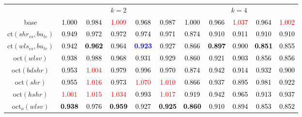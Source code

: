 \begin{tabular}[t]{c|>{}cccc>{}c|ccccc}
\multicolumn{1}{c}{} & \multicolumn{5}{c}{\textbf{$k = 2$}} & \multicolumn{5}{c}{\textbf{$k = 4$}}\\
base & \textcolor{black}{1.000} & \textcolor{black}{0.984} & \textcolor{red}{1.009} & \textcolor{black}{0.968} & \textcolor{black}{0.987} & \textcolor{black}{1.000} & \textcolor{black}{0.966} & \textcolor{red}{1.037} & \textcolor{black}{0.964} & \textcolor{red}{1.002}\\
ct$(shr_{cs}, bu_{te})$ & \textcolor{black}{0.949} & \textcolor{black}{0.972} & \textcolor{black}{0.972} & \textcolor{black}{0.974} & \textcolor{black}{0.971} & \textcolor{black}{0.874} & \textcolor{black}{0.910} & \textcolor{black}{0.911} & \textcolor{black}{0.910} & \textcolor{black}{0.910}\\
ct$(wls_{cs}, bu_{te})$ & \textcolor{black}{0.942} & \textcolor{black}{\textbf{0.962}} & \textcolor{black}{0.964} & \textcolor{blue}{\textbf{0.923}} & \textcolor{black}{0.927} & \textcolor{black}{0.866} & \textcolor{black}{\textbf{0.897}} & \textcolor{black}{0.900} & \textcolor{black}{\textbf{0.851}} & \textcolor{black}{0.855}\\
oct$(wlsv)$ & \textcolor{black}{0.938} & \textcolor{black}{0.988} & \textcolor{black}{0.968} & \textcolor{black}{0.931} & \textcolor{black}{0.929} & \textcolor{black}{0.860} & \textcolor{black}{0.921} & \textcolor{black}{0.903} & \textcolor{black}{0.856} & \textcolor{black}{0.856}\\
oct$(bdshr)$ & \textcolor{black}{0.953} & \textcolor{red}{1.004} & \textcolor{black}{0.979} & \textcolor{black}{0.996} & \textcolor{black}{0.970} & \textcolor{black}{0.874} & \textcolor{black}{0.942} & \textcolor{black}{0.914} & \textcolor{black}{0.932} & \textcolor{black}{0.900}\\
oct$(shr)$ & \textcolor{black}{0.955} & \textcolor{red}{1.016} & \textcolor{black}{0.973} & \textcolor{red}{1.070} & \textcolor{red}{1.010} & \textcolor{black}{0.866} & \textcolor{black}{0.937} & \textcolor{black}{0.895} & \textcolor{black}{0.981} & \textcolor{black}{0.922}\\
oct$(hshr)$ & \textcolor{red}{1.001} & \textcolor{red}{1.015} & \textcolor{red}{1.034} & \textcolor{black}{0.993} & \textcolor{red}{1.017} & \textcolor{black}{0.919} & \textcolor{black}{0.942} & \textcolor{black}{0.965} & \textcolor{black}{0.913} & \textcolor{black}{0.937}\\
oct$_o(wlsv)$ & \textcolor{black}{\textbf{0.938}} & \textcolor{black}{0.976} & \textcolor{black}{\textbf{0.959}} & \textcolor{black}{0.927} & \textcolor{black}{\textbf{0.925}} & \textcolor{black}{\textbf{0.860}} & \textcolor{black}{0.910} & \textcolor{black}{0.894} & \textcolor{black}{0.853} & \textcolor{black}{0.852}\\

\end{tabular}
